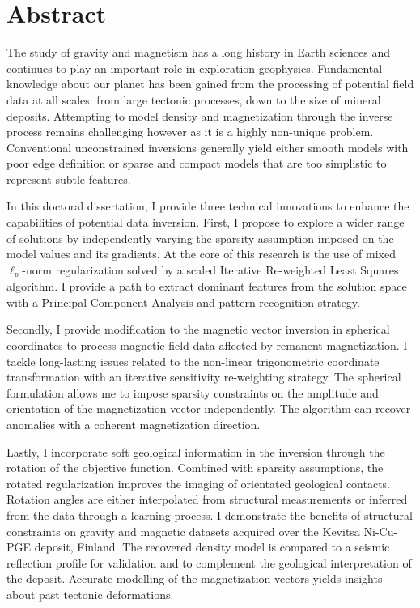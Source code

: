 
\chapter{Abstract}
The study of gravity and magnetism has a long history in Earth sciences and continues to play an important role in exploration geophysics. Fundamental knowledge about our planet has been gained from the processing of potential field data at all scales: from large tectonic processes, down to the size of mineral deposits. Attempting to model density and magnetization through the inverse process remains challenging however as it is a highly non-unique problem. Conventional unconstrained inversions generally yield either smooth models with poor edge definition or sparse and compact models that are too simplistic to represent subtle features. 

In this doctoral dissertation, I provide three technical innovations to enhance the capabilities of potential data inversion. First, I propose to explore a wider range of solutions by independently varying the sparsity assumption imposed on the model values and its gradients. At the core of this research is the use of mixed $\ell_p$-norm regularization solved by a scaled Iterative Re-weighted Least Squares algorithm. I provide a path to extract dominant features from the solution space with a Principal Component Analysis and pattern recognition strategy. 

Secondly, I provide modification to the magnetic vector inversion in spherical coordinates to process magnetic field data affected by remanent magnetization. I tackle long-lasting issues related to the non-linear trigonometric coordinate transformation with an iterative sensitivity re-weighting strategy. The spherical formulation allows me to impose sparsity constraints on the amplitude and orientation of the magnetization vector independently. The algorithm can recover anomalies with a coherent magnetization direction. 

Lastly, I incorporate soft geological information in the inversion through the rotation of the objective function. Combined with sparsity assumptions, the rotated regularization improves the imaging of orientated geological contacts. Rotation angles are either interpolated from structural measurements or inferred from the data through a learning process. I demonstrate the benefits of structural constraints on gravity and magnetic datasets acquired over the Kevitsa Ni-Cu-PGE deposit, Finland. The recovered density model is compared to a seismic reflection profile for validation and to complement the geological interpretation of the deposit. Accurate modelling of the magnetization vectors yields insights about past tectonic deformations.





